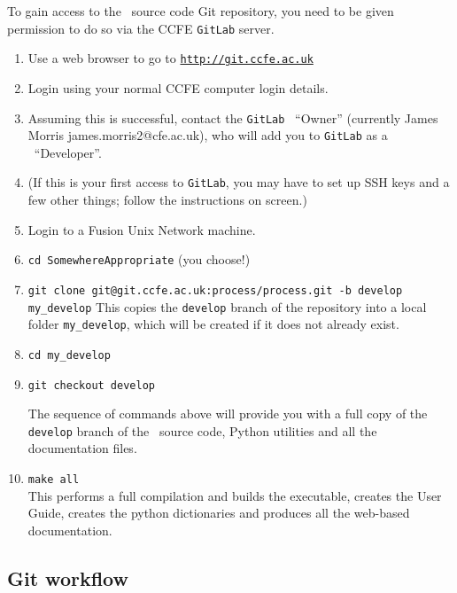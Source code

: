 To gain access to the \process\ source code Git repository, you need
to be given permission to do so via the CCFE \texttt{GitLab} server.
\begin{enumerate}

\item Use a web browser to go to
  \href{http://git.ccfe.ac.uk}{\texttt{http://git.ccfe.ac.uk}}

\item Login using your normal CCFE computer login details.

\item Assuming this is successful, contact the \texttt{GitLab} \process\
  ``Owner'' (currently James Morris james.morris2@cfe.ac.uk), who will add you to \texttt{GitLab} as a \process\ ``Developer''.

\item (If this is your first access to \texttt{GitLab}, you may have to set up
  SSH keys and a few other things; follow the instructions on screen.)

\item Login to a Fusion Unix Network machine.

\item \texttt{cd SomewhereAppropriate} (you choose!)

\item
\texttt{git clone git@git.ccfe.ac.uk:process/process.git -b develop my\_develop}
This copies the \texttt{develop} branch of the repository into a local folder \texttt{my\_develop}, which will be created if it does not already exist.
\item \texttt{cd my\_develop}

\item \texttt{git checkout develop}

The sequence of commands above will provide you with a full copy of the \texttt{develop} branch of the \process\ source code, Python utilities and all
the documentation files.

\item \texttt{make all}\\
This performs a full compilation and builds the executable, creates the User Guide, creates the python dictionaries and produces all the web-based documentation.

\end{enumerate}


\subsection{Git workflow}

